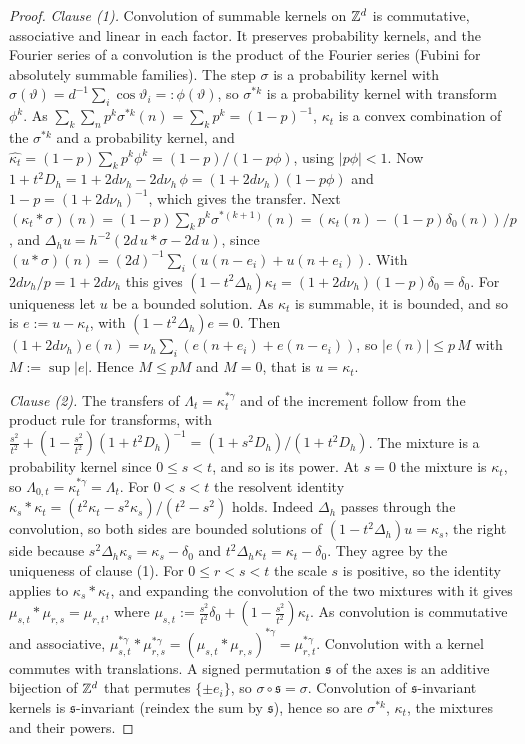\begin{proof}
\emph{Clause (1).} Convolution of summable kernels on $\mathbb{Z}^d$ is commutative, associative and
linear in each factor. It preserves probability kernels, and the Fourier series of a convolution is
the product of the Fourier series (Fubini for absolutely summable families). The step $\sigma$ is a
probability kernel with $\widehat\sigma(\vartheta) = d^{-1}\sum_i\cos\vartheta_i =: \phi(\vartheta)$, so
$\sigma^{*k}$ is a probability kernel with transform $\phi^k$. As $\sum_k\sum_np^k\sigma^{*k}(n) =
\sum_kp^k = (1-p)^{-1}$, $\kappa_t$ is a convex combination of the $\sigma^{*k}$ and a probability
kernel, and $\widehat{\kappa_t} = (1-p)\sum_kp^k\phi^k = (1-p)/(1-p\phi)$, using $|p\phi| < 1$. Now
$1 + t^2D_h = 1 + 2d\nu_h - 2d\nu_h\,\phi = (1 + 2d\nu_h)(1 - p\phi)$ and
$1 - p = (1+2d\nu_h)^{-1}$, which gives the transfer. Next
$(\kappa_t * \sigma)(n) = (1-p)\sum_kp^k\sigma^{*(k+1)}(n) = (\kappa_t(n) - (1-p)\delta_0(n))/p$,
and $\Delta_hu = h^{-2}(2d\,u * \sigma - 2d\,u)$, since
$(u * \sigma)(n) = (2d)^{-1}\sum_i(u(n-e_i) + u(n+e_i))$. With $2d\nu_h/p = 1 + 2d\nu_h$ this gives
$(1 - t^2\Delta_h)\kappa_t = (1 + 2d\nu_h)(1-p)\delta_0 = \delta_0$.
For uniqueness let $u$ be a bounded solution. As $\kappa_t$ is summable, it is bounded, and so is
$e := u - \kappa_t$, with $(1 - t^2\Delta_h)e = 0$. Then
$(1 + 2d\nu_h)e(n) = \nu_h\sum_i(e(n+e_i) + e(n-e_i))$, so $|e(n)| \le p\,M$ with $M := \sup|e|$.
Hence $M \le pM$ and $M = 0$, that is $u = \kappa_t$.

\emph{Clause (2).} The transfers of $\Lambda_t = \kappa_t^{*\gamma}$ and of the increment follow
from the product rule for transforms, with $\tfrac{s^2}{t^2} + (1 - \tfrac{s^2}{t^2})(1 +
t^2D_h)^{-1} = (1 + s^2D_h)/(1 + t^2D_h)$. The mixture is a probability kernel since $0 \le s < t$,
and so is its power. At $s = 0$ the mixture is $\kappa_t$, so $\Lambda_{0,t} = \kappa_t^{*\gamma} =
\Lambda_t$. For $0 < s < t$ the resolvent identity
$\kappa_s * \kappa_t = (t^2\kappa_t - s^2\kappa_s)/(t^2 - s^2)$ holds. Indeed $\Delta_h$ passes
through the convolution, so both sides are bounded solutions of $(1 - t^2\Delta_h)u = \kappa_s$, the
right side because $s^2\Delta_h\kappa_s = \kappa_s - \delta_0$ and $t^2\Delta_h\kappa_t = \kappa_t -
\delta_0$. They agree by the uniqueness of clause (1). For $0 \le r < s < t$ the scale $s$ is
positive, so the identity applies to $\kappa_s * \kappa_t$, and expanding the convolution of the two
mixtures with it gives $\mu_{s,t} * \mu_{r,s} = \mu_{r,t}$, where
$\mu_{s,t} := \tfrac{s^2}{t^2}\delta_0 + (1 - \tfrac{s^2}{t^2})\kappa_t$. As convolution is
commutative and associative, $\mu_{s,t}^{*\gamma} * \mu_{r,s}^{*\gamma} = (\mu_{s,t} *
\mu_{r,s})^{*\gamma} = \mu_{r,t}^{*\gamma}$. Convolution with a kernel commutes with translations.
A signed permutation $\mathfrak{s}$ of the axes is an additive bijection of $\mathbb{Z}^d$ that permutes
$\{\pm e_i\}$, so $\sigma\circ\mathfrak{s} = \sigma$. Convolution of $\mathfrak{s}$-invariant kernels
is $\mathfrak{s}$-invariant (reindex the sum by $\mathfrak{s}$), hence so are $\sigma^{*k}$,
$\kappa_t$, the mixtures and their powers.


\end{proof}
